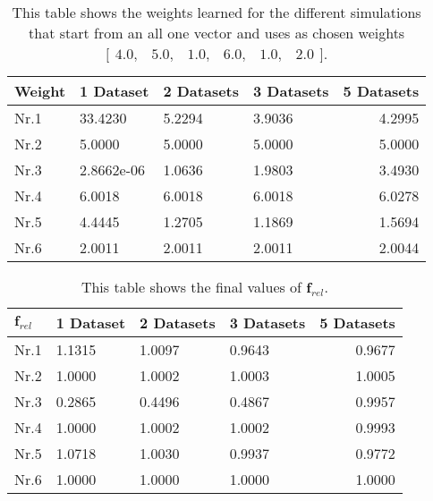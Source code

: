 \begin{table}[h!]
	\centering
	\begin{tabular}{@{}llllr@{}} \toprule
		\textbf{Weight}   & 1 Dataset    & 2 Datasets     & 3 Datasets & 5 Datasets\\ \midrule
		Nr.1       		  &33.4230       & 5.2294       & 3.9036 & 4.2995 		\\
		Nr.2              & 5.0000         & 5.0000          & 5.0000 &5.0000      \\
		Nr.3              & 2.8662e-06     & 1.0636      & 1.9803   &3.4930   \\
		Nr.4              & 6.0018           & 6.0018            &   6.0018&6.0278     \\
		Nr.5              & 4.4445     & 1.2705      & 1.1869 &1.5694      \\
		Nr.6              & 2.0011        & 2.0011         & 2.0011 & 2.0044     \\ \bottomrule
	\end{tabular}
	\caption{This table shows the weights learned for the different simulations that start from an all one vector and uses as chosen weights $\bigl[ \begin{smallmatrix} 4.0,&5.0,&1.0,&6.0,&1.0,&2.0\end{smallmatrix}\bigr]$.}
	\label{tab:complex_learning_weights}
\end{table}

\begin{table}[h!]
	\centering
	\begin{tabular}{@{}llllr@{}} \toprule
		$\bm{f}_{rel}$   & 1 Dataset    & 2 Datasets & 3 Datasets&5 Datasets\\ \midrule
		Nr.1       		  &1.1315        & 1.0097       & 0.9643&0.9677		\\
		Nr.2              & 1.0000         & 1.0002     & 1.0003&1.0005        \\
		Nr.3              & 0.2865     & 0.4496     	& 0.4867  &0.9957     \\
		Nr.4              & 1.0000           & 1.0002   &   1.0002 &0.9993     \\
		Nr.5              & 1.0718     & 1.0030         & 0.9937 &0.9772       \\
		Nr.6              & 1.0000        & 1.0000      & 1.0000 &1.0000    \\ \bottomrule
	\end{tabular}
	\caption{This table shows the final values of $\bm{f}_{rel}$.}
	\label{tab:complex_frel}
\end{table}

